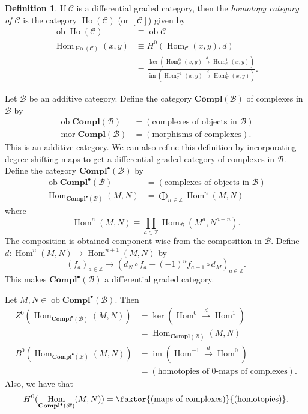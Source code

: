 \documentclass[10pt,letterpaper,cm]{nupset}
\theoremstyle{definition}
\newtheorem{definition}{Definition}[subsection]
\theoremstyle{theorem}
\theoremstyle{remark}
\newcommand{\Z}{\mathbb Z}
\newcommand{\1}{\mathbf{1}}
\renewcommand{\b}{\mathscr{B}}
\renewcommand{\c}{\mathscr{C}}
\newcommand{\0}{\vec 0}
\DeclareMathOperator{\im}{im}
\DeclareMathOperator{\mor}{mor}
\DeclareMathOperator{\ob}{ob}
\DeclareMathOperator{\Hom}{Hom}
\DeclareMathOperator{\ho}{Ho}
\begin{document}
\begin{definition}
If $\c$ is a differential graded category, then the \textit{homotopy category of $\c$} is the category $\ho(\c)$ (or $\left[\c\right]$) given by 
\begin{align*}
\ob{\ho(\c)} & \equiv \ob{\c}
\\  \Hom_{\ho(\c)}(x,y) & \equiv H^0(\Hom_{\c}(x,y), d)
\\ & =\frac{   \ker(\Hom^0_{\c}(x,y) \overset{d}{\longrightarrow} \Hom_{\c}^1(x,y))  }{  \im(\Hom_{\c}^{-1}(x,y) \overset{d}{\longrightarrow} \Hom_{\c}^0(x,y))      }.
\end{align*}
\end{definition}

\medskip

 Let $\b$ be an additive category. Define the category  $\mathbf{Compl}(\b)$  of complexes in $\b$ by 
\begin{align*}
\ob{\mathbf{Compl}(\b)} & = \left(\text{complexes of objects in } \b\right)
\\ \mor{\mathbf{Compl}(\b)} & = \left(\text{morphisms of complexes}\right).
\end{align*}
This is an additive category. We can also refine this definition by incorporating degree-shifting maps to get a differential graded category of complexes in $\b$. Define the category $\mathbf{Compl}^{\bullet}(\b)$ by 
\begin{align*}
\ob{\mathbf{Compl}^{\bullet}(\b)} & = \left(\text{complexes of objects in } \b\right)
\\ \Hom_{\mathbf{Compl}^{\bullet}(\b)}(M, N) & = \bigoplus_{n \in \Z}\Hom^n(M, N)
\end{align*}
where $$ \Hom^n(M , N) \equiv \prod_{a\in \Z} \Hom_{\b}(M^a, N^{a+n})  .$$  The composition is obtained component-wise from the composition in $\b$. Define $d : \Hom^n(M, N) \to \Hom^{n+1}(M, N)$ by $$ \left(f_a\right)_{a\in \Z} \to \left(d_N \circ f_a + ({-1})^n f_{a+1} \circ d_M\right)_{a\in \Z}  .$$ This makes $\mathbf{Compl}^{\bullet}(\b)$ a differential graded category. 

\medskip


Let $M , N \in \ob{\mathbf{Compl}^{\bullet}(\b)}$. Then 
\begin{align*}
Z^0(\Hom_{\mathbf{Compl}^{\bullet}(\b)}(M, N)) & =\ker(\Hom^0 \overset{d}{\longrightarrow} \Hom^1) 
\\
 & = \Hom_{\mathbf{Compl}(\b)}(M, N) 
 \\ B^0(\Hom_{\mathbf{Compl}^{\bullet}(\b)}(M, N)) & = \im(\Hom^{-1} \overset{d}{\longrightarrow} \Hom^0) 
 \\ & = \left(\text{homotopies of }0\text{-maps of complexes}\right).
 \end{align*} Also, we have that $$H^0(\Hom_{\mathbf{Compl}^{\bullet}(\b)}(M, N))=  \faktor{\left(\text{maps of complexes}\right)}{\left(\text{homotopies}\right)}.$$
\end{document}
